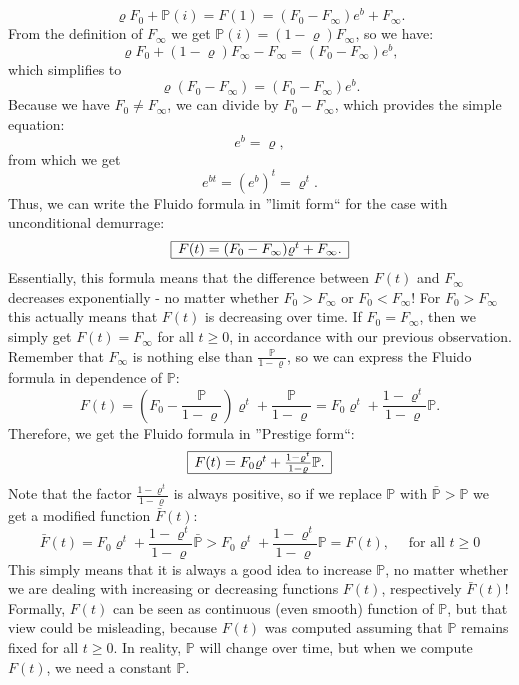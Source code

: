 \documentclass[a4paper,12pt]{scrartcl}
\newcounter{formula}
\begin{document}
$$\varrho F_0 + \mathbb{P}(i) = F(1) = (F_0-F_{\infty}) e^{b} + F_{\infty}.$$
From the definition of $F_{\infty}$ we get $\mathbb{P}(i) = (1-\varrho) F_{\infty}$, so we have:
$$\varrho F_0 + (1- \varrho) F_{\infty} - F_{\infty}= (F_0-F_{\infty}) e^{b},$$
which simplifies to
$$\varrho (F_0 - F_{\infty}) = (F_0-F_{\infty}) e^{b}.$$
Because we have $F_0 \neq F_{\infty}$, we can divide by $F_0 - F_{\infty}$, which provides the simple equation:
$$e^b = \varrho,$$
from which we get
$$e^{bt} = (e^b)^t = \varrho^t.$$
Thus, we can write the Fluido formula in ''limit form`` for the case with unconditional demurrage:
$$
\begin{array}{|l|}
\hline
F(t)=(F_0-F_{\infty}) \varrho^t + F_{\infty}.
\\
\hline
\end{array}$$
Essentially, this formula means that the difference between $F(t)$ and $F_{\infty}$ decreases exponentially - no matter whether $F_0 > F_{\infty}$ or $F_0 < F_{\infty}$! For $F_0 > F_{\infty}$ this actually means that $F(t)$ is decreasing over time. If $F_0 = F_{\infty}$, then we simply get $F(t) = F_{\infty}$ for all $t \geq 0$, in accordance with our previous observation.\\
Remember that $F_{\infty}$ is nothing else than $\frac{\mathbb{P}}{1-\varrho}$, so we can express the Fluido formula in dependence of $\mathbb{P}$:
$$F(t) = \left(F_0-\frac{\mathbb{P}}{1-\varrho}\right) \varrho^t + \frac{\mathbb{P}}{1-\varrho} = F_0 \varrho^t + \frac{1- \varrho^t}{1-\varrho} \mathbb{P}.$$
Therefore, we get the Fluido formula in ''Prestige form``:
$$
\begin{array}{|l|}
\hline
F(t)= F_0 \varrho^t + \frac{1- \varrho^t}{1-\varrho} \mathbb{P}.
\\
\hline
\end{array}$$
Note that the factor $\frac{1- \varrho^t}{1-\varrho}$ is always positive, so if we replace $\mathbb{P}$ with $\bar{\mathbb{P}} > \mathbb{P}$ we get a modified function $\bar{F}(t)$:
$$\bar{F}(t) = F_0 \varrho^t + \frac{1- \varrho^t}{1-\varrho} \bar{\mathbb{P}} > F_0 \varrho^t + \frac{1- \varrho^t}{1-\varrho} \mathbb{P} = F(t), \quad \mbox{ for all } t \geq 0$$
This simply means that it is always a good idea to increase $\mathbb{P}$, no matter whether we are dealing with increasing or decreasing functions $F(t)$, respectively $\bar{F}(t)$!\\
Formally, $F(t)$ can be seen as continuous (even smooth) function of $\mathbb{P}$, but that view could be misleading, because $F(t)$ was computed assuming that $\mathbb{P}$ remains fixed for all $t \geq 0$. In reality, $\mathbb{P}$ will change over time, but when we compute $F(t)$, we need a constant $\mathbb{P}$.
\end{document}
